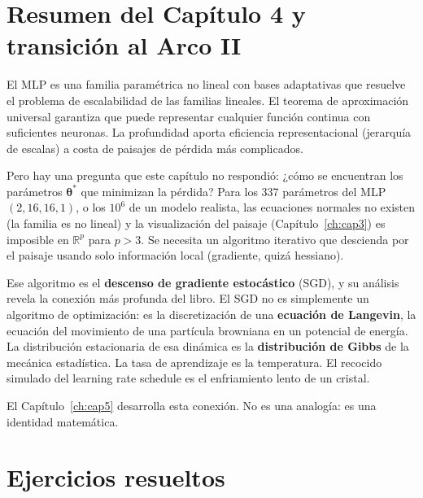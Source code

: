 \section{Resumen del Capítulo 4 y transición al Arco II}
\label{sec:resumen4}

El MLP es una familia paramétrica no lineal con bases adaptativas que
resuelve el problema de escalabilidad de las familias lineales. El
teorema de aproximación universal garantiza que puede representar
cualquier función continua con suficientes neuronas. La profundidad
aporta eficiencia representacional (jerarquía de escalas) a costa de
paisajes de pérdida más complicados.

Pero hay una pregunta que este capítulo no respondió: ¿cómo se
encuentran los parámetros $\bm{\theta}^*$ que minimizan la pérdida?
Para los 337 parámetros del MLP $(2, 16, 16, 1)$, o los $10^6$ de un
modelo realista, las ecuaciones normales no existen (la familia es no
lineal) y la visualización del paisaje (Capítulo~\ref{ch:cap3}) es
imposible en $\mathbb{R}^p$ para $p > 3$. Se necesita un algoritmo
iterativo que descienda por el paisaje usando solo información local
(gradiente, quizá hessiano).

Ese algoritmo es el \textbf{descenso de gradiente estocástico} (SGD),
y su análisis revela la conexión más profunda del libro. El SGD no es
simplemente un algoritmo de optimización: es la discretización de una
\textbf{ecuación de Langevin}, la ecuación del movimiento de una
partícula browniana en un potencial de energía. La distribución
estacionaria de esa dinámica es la \textbf{distribución de Gibbs} de
la mecánica estadística. La tasa de aprendizaje es la temperatura. El
recocido simulado del learning rate schedule es el enfriamiento lento
de un cristal.

El Capítulo~\ref{ch:cap5} desarrolla esta conexión. No es una analogía:
es una identidad matemática.

\section*{Ejercicios resueltos}

